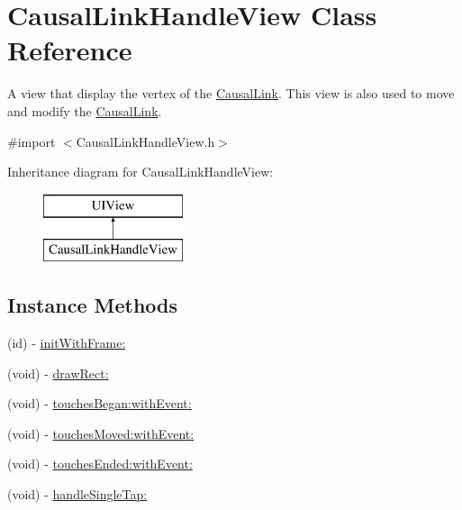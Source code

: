 \hypertarget{interface_causal_link_handle_view}{\section{Causal\-Link\-Handle\-View Class Reference}
\label{interface_causal_link_handle_view}
}


A view that display the vertex of the \hyperlink{interface_causal_link}{Causal\-Link}. This view is also used to move and modify the \hyperlink{interface_causal_link}{Causal\-Link}.  




{\ttfamily \#import $<$Causal\-Link\-Handle\-View.\-h$>$}

Inheritance diagram for Causal\-Link\-Handle\-View\-:\begin{figure}[H]
\begin{center}
\leavevmode
\includegraphics[height=2.000000cm]{interface_causal_link_handle_view}
\end{center}
\end{figure}
\subsection*{Instance Methods}
\begin{DoxyCompactItemize}
\item 
(id) -\/ \hyperlink{interface_causal_link_handle_view_a100c2da2d92d7d9a4da9ad851dcc1114}{init\-With\-Frame\-:}
\item 
(void) -\/ \hyperlink{interface_causal_link_handle_view_a8c03538769a6fcbd7aa8e672cf4b5c96}{draw\-Rect\-:}
\item 
(void) -\/ \hyperlink{interface_causal_link_handle_view_a2357112d7fefe9f720ac82c881236830}{touches\-Began\-:with\-Event\-:}
\item 
(void) -\/ \hyperlink{interface_causal_link_handle_view_a06bf1152e9fa0dd16bf7f46128ae0cff}{touches\-Moved\-:with\-Event\-:}
\item 
(void) -\/ \hyperlink{interface_causal_link_handle_view_ad9cc995e0aa0c5e28ab827a06c897c36}{touches\-Ended\-:with\-Event\-:}
\item 
(void) -\/ \hyperlink{interface_causal_link_handle_view_a38393b10eebe5376725616eb446df377}{handle\-Single\-Tap\-:}
\end{DoxyCompactItemize}
